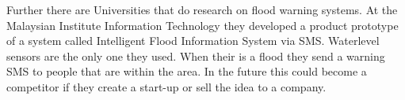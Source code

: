 Further there are Universities that do research on flood warning systems. At the Malaysian Institute Information Technology they developed a product prototype of a system called Intelligent Flood Information System via SMS. Waterlevel sensors are the only one they used. When their is a flood they send a warning SMS to people that are within the area. In the future this could become a competitor if they create a start-up or sell the idea to a company.  



